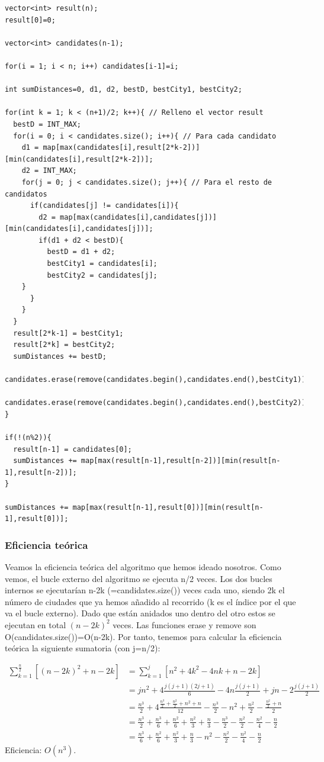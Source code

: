 \documentclass[a4]{article}
\begin{document}
\begin{lstlisting}
vector<int> result(n);
result[0]=0;

vector<int> candidates(n-1);

for(i = 1; i < n; i++) candidates[i-1]=i;

int sumDistances=0, d1, d2, bestD, bestCity1, bestCity2;

for(int k = 1; k < (n+1)/2; k++){ // Relleno el vector result
  bestD = INT_MAX;
  for(i = 0; i < candidates.size(); i++){ // Para cada candidato
    d1 = map[max(candidates[i],result[2*k-2])][min(candidates[i],result[2*k-2])];
    d2 = INT_MAX;
    for(j = 0; j < candidates.size(); j++){ // Para el resto de candidatos
      if(candidates[j] != candidates[i]){
        d2 = map[max(candidates[i],candidates[j])][min(candidates[i],candidates[j])];
        if(d1 + d2 < bestD){
          bestD = d1 + d2;
          bestCity1 = candidates[i];
          bestCity2 = candidates[j];
	}
      }
    }
  }
  result[2*k-1] = bestCity1;
  result[2*k] = bestCity2;
  sumDistances += bestD;
  candidates.erase(remove(candidates.begin(),candidates.end(),bestCity1));
  candidates.erase(remove(candidates.begin(),candidates.end(),bestCity2));
}

if(!(n%2)){
  result[n-1] = candidates[0];
  sumDistances += map[max(result[n-1],result[n-2])][min(result[n-1],result[n-2])];
}

sumDistances += map[max(result[n-1],result[0])][min(result[n-1],result[0])];
\end{lstlisting}

\subsubsection{Eficiencia teórica}
Veamos la eficiencia teórica del algoritmo que hemos ideado
nosotros. Como vemos, el bucle externo del algoritmo se ejecuta n/2
veces. Los dos bucles internos se ejecutarían n-2k
(=candidates.size()) veces cada uno, siendo 2k el número de ciudades
que ya hemos añadido al recorrido (k es el índice por el que va el
bucle externo). Dado que están anidados uno dentro del otro estos se
ejecutan en total $(n-2k)^2$ veces. Las funciones erase y remove son
O(candidates.size())=O(n-2k). Por tanto, tenemos para calcular la
eficiencia teórica la siguiente sumatoria (con j=n/2):

  \begin{align*}
  \sum_{k=1}^{\frac{n}{2}}[(n-2k)^2+n-2k] &=\sum_{k=1}^j[n^2+4k^2-4nk+n-2k]\\&=jn^2+4\frac{j(j+1)(2j+1)}{6}-4n\frac{j(j+1)}{2}+jn-2\frac{j(j+1)}{2}\\&=\frac{n^3}{2}+4\frac{\frac{n^3}{2}+\frac{n^2}{2}+n^2+n}{12}-\frac{n^3}{2}-n^2+\frac{n^2}{2}-\frac{\frac{n^2}{2}+n}{2}\\&=\frac{n^3}{2}+\frac{n^3}{6}+\frac{n^2}{6}+\frac{n^2}{3}+\frac{n}{3}-\frac{n^3}{2}-\frac{n^2}{2}-\frac{n^2}{4}-\frac{n}{2}\\&=\frac{n^3}{6}+\frac{n^2}{6}+\frac{n^2}{3}+\frac{n}{3}-n^2-\frac{n^2}{2}-\frac{n^2}{4}-\frac{n}{2}
  \end{align*}
  Eficiencia: $O(n^3)$.
\end{document}
